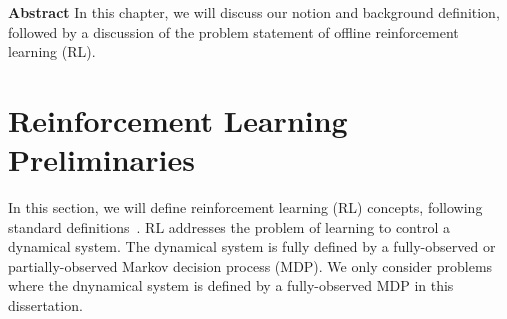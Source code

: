 \documentclass[../thesis.tex]{subfiles}
\begin{document}

% 

% 
% 
% 
% 
% 
% 


\vspace{-0.4cm}
\begin{AIbox}{\large{\textbf{Abstract}}}
\vspace{4mm}
In this chapter, we will discuss our notion and background definition, followed by a discussion of the problem statement of offline reinforcement learning (RL).   
\vspace{2mm}
\end{AIbox}


\section{Reinforcement Learning Preliminaries}
\label{sec:rl_prelims}

In this section, we will define reinforcement learning (RL) concepts, following standard definitions~\citep{suttonrlbook}. RL addresses the problem of learning to control a dynamical system. The dynamical system is fully defined by a fully-observed or partially-observed Markov decision process (MDP). We only consider problems where the dnynamical system is defined by a fully-observed MDP in this dissertation. 
\end{document}
